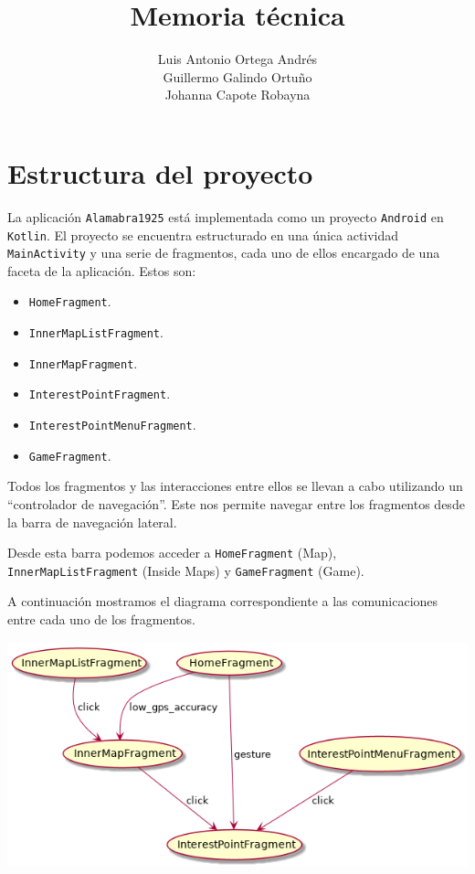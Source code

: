 \documentclass[11pt]{article}
\author{Luis Antonio Ortega Andrés  \\Guillermo Galindo Ortuño  \\ Johanna Capote Robayna}
\date{}
\title{Memoria técnica}
\begin{document}
\maketitle

\section{Estructura del proyecto}
\label{sec:org0852c2d}

La aplicación \texttt{Alamabra1925} está implementada como un proyecto \texttt{Android} en \texttt{Kotlin}.
El proyecto se encuentra estructurado en una única actividad \texttt{MainActivity} y una serie de fragmentos, cada uno de ellos encargado de una faceta de la aplicación.
Estos son:
\begin{itemize}
\item \texttt{HomeFragment}.
\item \texttt{InnerMapListFragment}.
\item \texttt{InnerMapFragment}.
\item \texttt{InterestPointFragment}.
\item \texttt{InterestPointMenuFragment}.
\item \texttt{GameFragment}.
\end{itemize}

Todos los fragmentos y las interacciones entre ellos se llevan a cabo utilizando un ``controlador de navegación''. Este nos permite navegar entre los fragmentos desde la barra de navegación lateral. 

Desde esta barra podemos acceder a \texttt{HomeFragment} (Map), \texttt{InnerMapListFragment} (Inside Maps) y \texttt{GameFragment} (Game).

A continuación mostramos el diagrama correspondiente a las comunicaciones entre cada uno de los fragmentos. 

\begin{center}
\includegraphics[width=.9\linewidth]{./diagrama1.png}
\end{center}
\end{document}
